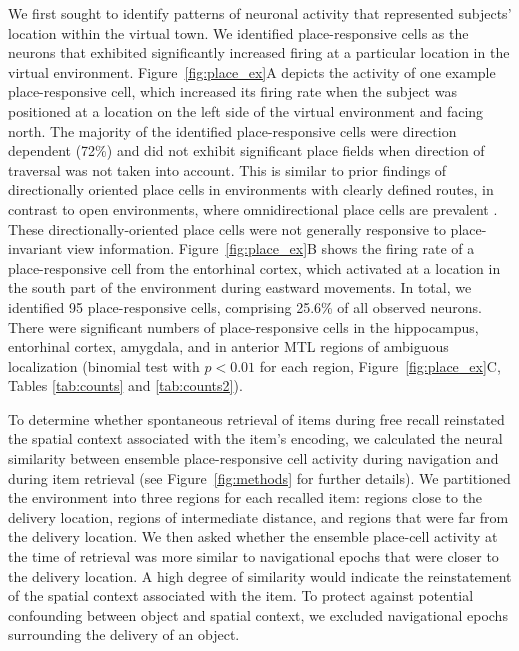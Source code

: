 We first sought to identify patterns of neuronal activity that represented subjects' location within the virtual town. We identified place-responsive cells as the neurons that exhibited significantly increased firing at a particular location in the virtual environment. Figure~\ref{fig:place_ex}A depicts the activity of one example place-responsive cell, which increased its firing rate when the subject was positioned at a location on the left side of the virtual environment and facing north.  The majority of the identified place-responsive cells were direction dependent (72\%) and did not exhibit significant place fields when direction of traversal was not taken into account.  This is similar to prior findings of directionally oriented place cells in environments with clearly defined routes, in contrast to open environments, where omnidirectional place cells are prevalent \cite{MullEtal94,EkstEtal03}.  These directionally-oriented place cells were not generally responsive to place-invariant view information. Figure~\ref{fig:place_ex}B shows the firing rate of a place-responsive cell from the entorhinal cortex, which activated at a location in the south part of the environment during eastward movements.  In total, we identified 95 place-responsive cells, comprising 25.6\% of all observed neurons. There were significant numbers of place-responsive cells in the hippocampus, entorhinal cortex, amygdala, and in anterior MTL regions of ambiguous localization (binomial test with $p<0.01$ for each region, Figure~\ref{fig:place_ex}C, Tables \ref{tab:counts} and \ref{tab:counts2}).

To determine whether spontaneous retrieval of items during free recall reinstated the spatial context associated with the item's encoding, we calculated the neural similarity between ensemble place-responsive cell activity during navigation and during item retrieval (see Figure~\ref{fig:methods} for further details).  We partitioned the environment into three regions for each recalled item: regions close to the delivery location, regions of intermediate distance, and regions that were far from the delivery location.  We then asked whether the ensemble place-cell activity at the time of retrieval was more similar to navigational epochs that were closer to the delivery location.  A high degree of similarity would indicate the reinstatement of the spatial context associated with the item.  To protect against potential confounding between object and spatial context, we excluded navigational epochs surrounding the delivery of an object.  

